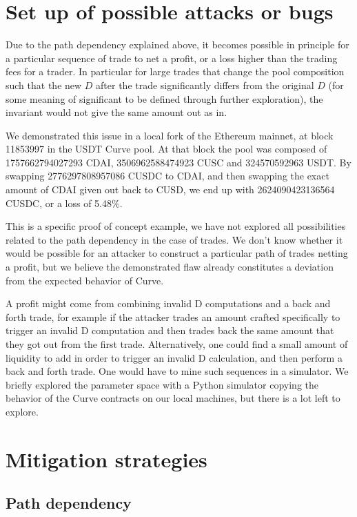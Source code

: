 \documentclass{article}
\begin{document}
{{{{    \section{Set up of possible attacks or bugs}

    Due to the path dependency explained above, it becomes possible in principle for a particular sequence of trade to net a profit, or a loss higher than the trading fees for a trader. In particular for large trades that change the pool composition such that the new $D$ after the trade significantly differs from the original $D$ (for some meaning of significant to be defined through further exploration), the invariant would not give the same amount out as in. 
    
    We demonstrated this issue in a local fork of the Ethereum mainnet, at block 11853997 in the USDT Curve pool. At that block the pool was composed of 1757662794027293 CDAI,  3506962588474923 CUSC and 324570592963 USDT. By swapping 2776297808957086 CUSDC to CDAI, and then swapping the exact amount of CDAI given out back to CUSD, we end up with 2624090423136564 CUSDC, or a loss of 5.48\%. 

    This is a specific proof of concept example, we have not explored all possibilities related to the path dependency in the case of trades. We don't know whether it would be possible for an attacker to construct a particular path of trades netting a profit, but we believe the demonstrated flaw already constitutes a deviation from the expected behavior of Curve. 

    A profit might come from combining invalid D computations and a back and forth trade, for example if the attacker trades an amount crafted specifically to trigger an invalid D computation and then trades back the same amount that they got out from the first trade. Alternatively, one could find a small amount of liquidity to add in order to trigger an invalid D calculation, and then perform a back and forth trade. One would have to mine such sequences in a simulator. We briefly explored the parameter space with a Python simulator copying the behavior of the Curve contracts on our local machines, but there is a lot left to explore. 

    \section{Mitigation strategies}

    \subsection{Path dependency}

}}}}
\end{document}
